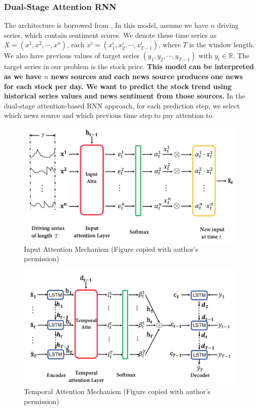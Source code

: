 \documentclass[11pt,a4paper]{article}
\begin{document}
\subsubsection{Dual-Stage Attention RNN}

The architecture is borrowed from \cite{dual_attention}. In this model, assume we have $n$ driving series, which contain sentiment scores. We denote these time series as $X=(x^1, x^2, \cdots, x^n)$, each $x^i=(x^{i}_{1}, x^{i}_{2}, \cdots, x^{i}_{T-1})$, where $T$ is the window length. We also have previous values of target series $(y_1, y_2, \cdots, y_{T-1})$ with $y_t\in \mathbb{R}$. The target series in our problem is the stock price. \textbf{This model can be interpreted as we have $n$ news sources and each news source produces one news for each stock per day. We want to predict the stock trend using historical series values and news sentiment from those sources.} In the dual-stage attention-based RNN approach, for each prediction step, we select which news source and which previous time step to pay attention to.

\begin{figure}
  \centering
  \includegraphics[width=\linewidth]{input_attention}
  \caption{Input Attention Mechanism (Figure copied with author's permission)}
  \label{fig:input_attention}
\end{figure}

\begin{figure}
  \centering
  \includegraphics[width=\linewidth]{temporal_attention}
  \caption{Temporal Attention Mechanism (Figure copied with author's permission)}
  \label{fig:temporal_attention}
\end{figure}
\end{document}
